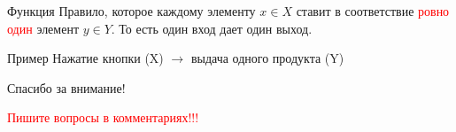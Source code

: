 \documentclass{beamer}
\newenvironment{rexample}[1][Пример]{\begin{exampleblock}{#1}}{\end{exampleblock}}
\begin{document}
\begin{frame}{Функция}
    Правило, которое каждому элементу $x \in X$ ставит в соответствие \textcolor{red}{ровно один} элемент $y \in Y$. То есть один вход дает один выход.
    \begin{rexample}
Нажатие кнопки (X) $\rightarrow$ выдача одного продукта (Y)
\end{rexample}
\end{frame}

\begin{frame}{}
    \centering
    \Large Спасибо за внимание!
    
    \vspace{1cm}
    \small \textcolor{red}{Пишите вопросы в комментариях!!!}
\end{frame}
\end{document}
